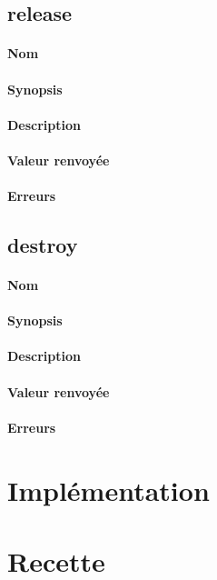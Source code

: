 \documentclass[12pt]{article}
\begin{document}
    \newpage
    \subsection{release}
        \paragraph{Nom}
        \paragraph{Synopsis}
        \paragraph{Description}
        \paragraph{Valeur renvoyée}
        \paragraph{Erreurs}
    \newpage
    \subsection{destroy}
        \paragraph{Nom}
        \paragraph{Synopsis}
        \paragraph{Description}
        \paragraph{Valeur renvoyée}
        \paragraph{Erreurs}
    \newpage

\section{Implémentation}

\section{Recette}
		
\end{document}
